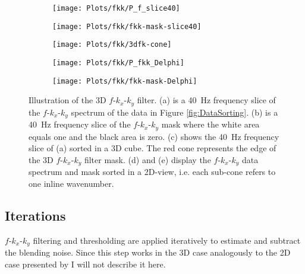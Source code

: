 \documentclass{madrid15WS}
\begin{document}
\begin{figure}[h!]
	\centering
	\begin{subfigure}[t]{0.3\textwidth}
		\centering
		\texttt{[image: Plots/fkk/P\_f\_slice40]}
		\caption{}
		\label{fig:FK-f_slice-data}
	\end{subfigure}
	\centering
	\begin{subfigure}[t]{0.3\textwidth}
		\centering
		\texttt{[image: Plots/fkk/fkk-mask-slice40]}
		\caption{}
		\label{fig:FK-f_slice-mask}
	\end{subfigure}
	\centering
	\begin{subfigure}[t]{0.3\textwidth}
		\centering
		\texttt{[image: Plots/fkk/3dfk-cone]}
		\caption{}
		\label{fig:FK-f_slice-data3d}
	\end{subfigure}
	
	\begin{subfigure}[t]{\textwidth}
		\centering
		\texttt{[image: Plots/fkk/P\_fkk\_Delphi]}
		\caption{}
		\label{fig:FK-delphi-data}
	\end{subfigure}
	\par\bigskip
	\begin{subfigure}[t]{\textwidth}
		\centering
		\texttt{[image: Plots/fkk/fkk-mask-Delphi]}
		\caption{}
		\label{fig:FK-delphi-mask}
	\end{subfigure}
	
	\caption{Illustration of the 3D $f$-$k_x$-$k_y$ filter. (a) is a \SI{40}{\hertz} frequency slice of the $f$-$k_x$-$k_y$ spectrum of the data in Figure \ref{fig:DataSorting}. (b) is a \SI{40}{\hertz} frequency slice of the $f$-$k_x$-$k_y$ mask where the white area equals one and the black area is zero. (c) shows the \SI{40}{\hertz} frequency slice of (a) sorted in a 3D cube. The red cone represents the edge of the 3D $f$-$k_x$-$k_y$ filter mask. (d) and (e) display the $f$-$k_x$-$k_y$ data spectrum and mask sorted in a 2D-view, i.e. each sub-cone refers to one inline wavenumber.}
	\label{fig:FKK-Mask}

\end{figure}




\subsection{Iterations}

$f$-$k_x$-$k_y$ filtering and thresholding are applied iteratively to estimate and subtract the blending noise. Since this step works in the 3D case analogously to the 2D case presented by \citet{Mahdad-Deblending-Method} I will not describe it here.
\end{document}
